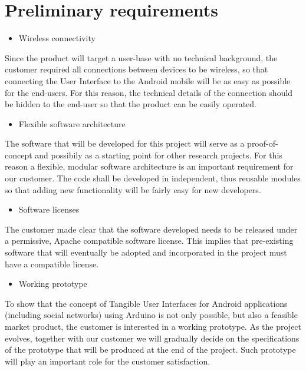 
\section{Preliminary requirements}
\begin{itemize}
\item Wireless connectivity 
\end{itemize}
Since the product will target a user-base with no technical background,
the customer required all connections between devices to be wireless,
so that connecting the User Interface to the Android mobile will be
as easy as possible for the end-users. For this reason, the technical
details of the connection should be hidden to the end-user so that
the product can be easily operated. 
\begin{itemize}
\item Flexible software architecture 
\end{itemize}
The software that will be developed for this project will serve as
a proof-of-concept and possibily as a starting point for other research
projects. For this reason a flexible, modular software architecture
is an important requirement for our customer. The code shall be developed
in independent, thus reusable modules so that adding new functionality
will be fairly easy for new developers. 
\begin{itemize}
\item Software licenses 
\end{itemize}
The customer made clear that the software developed needs to be released
under a permissive, Apache compatible software license. This implies
that pre-existing software that will eventually be adopted and incorporated
in the project must have a compatible license. 
\begin{itemize}
\item Working prototype 
\end{itemize}
To show that the concept of Tangible User Interfaces for Android applications
(including social networks) using Arduino is not only possible, but
also a feasible market product, the customer is interested in a working
prototype. As the project evolves, together with our customer we will
gradually decide on the specifications of the prototype that will
be produced at the end of the project. Such prototype will play an
important role for the customer satisfaction. 
